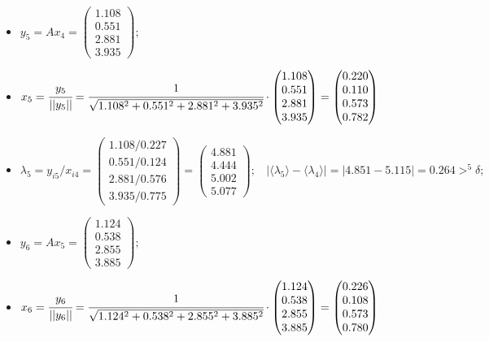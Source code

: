 \begin{itemize}
    \item
    $y_5 = Ax_4 =
    \begin{pmatrix}
        1.108\\0.551\\2.881\\3.935
    \end{pmatrix};$

    \item
    $x_5 = \cfrac{y_5}{||y_5||} = \cfrac{1}{\sqrt{1.108^2+0.551^2+2.881^2+3.935^2}}\cdot
    \begin{pmatrix}
        1.108\\0.551\\2.881\\3.935
    \end{pmatrix} =
    \begin{pmatrix}
        0.220\\0.110\\0.573\\0.782
    \end{pmatrix}$

    \item
    $\lambda_5 = y_{i5} / x_{i4} =
    \begin{pmatrix}
        1.108/0.227\\
        0.551/0.124\\
        2.881/0.576\\
        3.935/0.775
    \end{pmatrix} =
    \begin{pmatrix}
        4.881\\4.444\\5.002\\5.077
    \end{pmatrix};~~~~
    |\langle\lambda_5\rangle-\langle\lambda_4\rangle| = |4.851-5.115| = 0.264 >^5 \delta;$



    \item
    $y_6 = Ax_5 =
    \begin{pmatrix}
        1.124\\0.538\\2.855\\3.885
    \end{pmatrix};$

    \item
    $x_6 = \cfrac{y_6}{||y_6||} = \cfrac{1}{\sqrt{1.124^2+0.538^2+2.855^2+3.885^2}}\cdot
    \begin{pmatrix}
        1.124\\0.538\\2.855\\3.885
    \end{pmatrix} =
    \begin{pmatrix}
        0.226\\0.108\\0.573\\0.780
    \end{pmatrix}$


\end{itemize}
